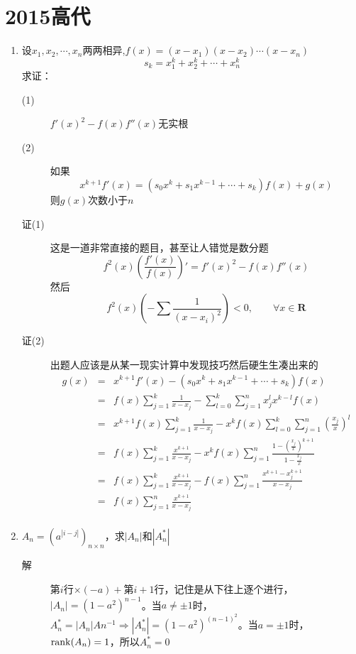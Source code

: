 \section{2015高代}
\begin{enumerate}
\item 设$x_1,x_2,\cdots,x_n$两两相异,$f(x) = (x-x_1)(x-x_2)\cdots(x-x_n)$
\[
s_k = x_1^k + x_2^k + \cdots + x_n^k
\]
求证：
\begin{description}
\item[(1)] $f'(x)^2-f(x)f''(x)$无实根
\item[(2)] 如果
\[
x^{k+1}f'(x) = (s_0x^k + s_1x^{k-1} + \cdots + s_k)f(x) + g(x)
\]
则$g(x)$次数小于$n$
\item[证(1)] 这是一道非常直接的题目，甚至让人错觉是数分题
\[
f^2(x)\left(\frac{f'(x)}{f(x)}\right)' = f'(x)^2-f(x)f''(x)
\]
然后
\[
f^2(x)\left(-\sum\frac{1}{(x-x_i)^2}\right) <0 ,\qquad \forall x \in \mathbf{R}
\]
\item[证(2)] 出题人应该是从某一现实计算中发现技巧然后硬生生凑出来的
\begin{eqnarray*}
g(x) & = & x^{k+1}f'(x)-(s_0x^k+s_1x^{k-1}+\cdots+s_k)f(x) \\
     & = & f(x)\sum_{j=1}^k\frac{1}{x-x_j}-\sum_{l=0}^k\sum_{j=1}^nx_j^lx^{k-l}f(x) \\
     & = & x^{k+1}f(x)\sum_{j=1}^k\frac{1}{x-x_j}-x^kf(x)\sum_{l=0}^k\sum_{j=1}^n(\frac{x_j}{x})^l \\
     & = & f(x)\sum_{j=1}^k\frac{x^{k+1}}{x-x_j} - x^kf(x)\sum_{j=1}^n\frac{1-(\frac{x_j}{x})^{k+1}}{1-\frac{x_j}{x}} \\
     & = & f(x)\sum_{j=1}^k\frac{x^{k+1}}{x-x_j} - f(x)\sum_{j=1}^n\frac{x^{k+1}-x^{k+1}_j}{x-x_j} \\
     & = & f(x)\sum_{j=1}^n\frac{x^{k+1}}{x-x_j} \\
\end{eqnarray*}
\end{description}

\item $A_n=(a^{|i-j|})_{n\times n}$，求$|A_n|$和$|A_n^*|$
\begin{description}
\item[解] 第$i$行$\times (-a) +$第$i+1$行，记住是从下往上逐个进行，$|A_n|=(1-a^2)^{n-1}$。当$a\neq\pm1$时，$A_n^*=|A_n|An^{-1} \Rightarrow|A_n^*| = (1-a^2)^{(n-1)^2}$。当$a =\pm1$时，$\operatorname{rank}(A_n)=1$，所以$A_n^*=0$
\end{description}


\end{enumerate}
